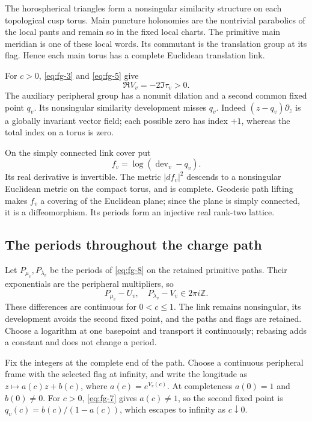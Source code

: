 The horospherical triangles form a nonsingular similarity structure on each topological cusp torus. Main puncture holonomies are the nontrivial parabolics of the local pants and remain so in the fixed local charts. The primitive main meridian is one of these local words. Its commutant is the translation group at its flag. Hence each main torus has a complete Euclidean translation link.

For \(c>0\), \eqref{eq:fg-3} and \eqref{eq:fg-5} give
\begin{equation}
\Re V_v=-2\Im\tau_v>0.
\label{eq:fg-7}
\end{equation}
The auxiliary peripheral group has a nonunit dilation and a second common fixed point \(q_v\). Its nonsingular similarity development misses \(q_v\). Indeed \((z-q_v)\partial_z\) is a globally invariant vector field; each possible zero has index \(+1\), whereas the total index on a torus is zero.

On the simply connected link cover put
\begin{equation}
f_v=\log(\operatorname{dev}_v-q_v).
\label{eq:fg-8}
\end{equation}
Its real derivative is invertible. The metric \(|df_v|^2\) descends to a nonsingular Euclidean metric on the compact torus, and is complete. Geodesic path lifting makes \(f_v\) a covering of the Euclidean plane; since the plane is simply connected, it is a diffeomorphism. Its periods form an injective real rank-two lattice.

\subsection{The periods throughout the charge path}\label{sec:fg-4}

Let \(P_{\mu_v},P_{\lambda_v}\) be the periods of \eqref{eq:fg-8} on the retained primitive paths. Their exponentials are the peripheral multipliers, so
\begin{equation}
P_{\mu_v}-U_v,\quad P_{\lambda_v}-V_v
                                         \in2\pi i\mathbb Z.
\label{eq:fg-9}
\end{equation}
These differences are continuous for \(0<c\le1\). The link remains nonsingular, its development avoids the second fixed point, and the paths and flags are retained. Choose a logarithm at one basepoint and transport it continuously; rebasing adds a constant and does not change a period.

Fix the integers at the complete end of the path. Choose a continuous
peripheral frame with the selected flag at infinity, and write the
longitude as \(z\mapsto a(c)z+b(c)\), where \(a(c)=e^{V_v(c)}\).
At completeness \(a(0)=1\) and \(b(0)\ne0\). For \(c>0\),
\eqref{eq:fg-7} gives \(a(c)\ne1\), so the second fixed point is
\(q_v(c)=b(c)/(1-a(c))\), which escapes to infinity as \(c\downarrow0\).

